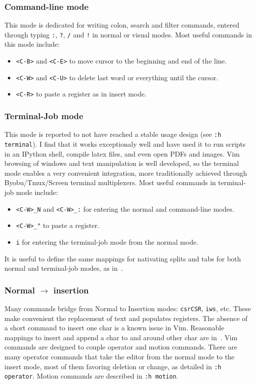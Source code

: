 \documentclass{article}
\newcommand{\ttt}[1] {
	\texttt{<#1>}}
\newcommand{\tttt}[1]{\texttt{#1}}
\begin{document}
\subsubsection{Command-line mode}
This mode is dedicated for writing colon, search and filter commands,
entered through typing \tttt{:}, \tttt{?}, \tttt{/} and \tttt{!} in normal or visual modes.
Most useful commands in this mode include:
\begin{itemize}
  \item \ttt{C-B} and \ttt{C-E} to move cursor to the beginning and
    end of the line.
  \item \ttt{C-W} and \ttt{C-U} to delete last word or everything
    until the cursor.
  \item \ttt{C-R} to paste a register as in insert mode.
\end{itemize}

\subsubsection{Terminal-Job mode}\label{terminal}
This mode is reported to not have reached a stable usage design
(see \tttt{:h terminal}).
I find that it works exceptionaly well and have used it to run
scripts in an IPython shell, compile latex files, and even open PDFs and images.
Vim browsing of windows and text manipulation is well developed,
so the terminal mode enables a very convenient integration,
more traditionally achieved through Byobu/Tmux/Screen terminal
multiplexers.
Most useful commands in terminal-job mode include:
\begin{itemize}
  \item \tttt{<C-W>\_N} and \tttt{<C-W>\_:} for entering the normal
    and command-line modes.
  \item \tttt{<C-W>\_"} to paste a register.
  \item \tttt{i} for entering the terminal-job mode from the normal mode.
\end{itemize}

It is useful to define the same mappings for nativating splits and tabs
for both normal and terminal-job modes, as in~\cite{vimrc}.

\subsubsection{Normal $\rightarrow$ insertion}\label{navIn}
Many commands bridge from Normal to Insertion modes:
\tttt{csrCSR}, \tttt{iws}, etc.
These make convenient the replacement of text and populates registers.
The absence of a short command to insert one char is
a known issue in Vim.
Reasonable mappings to insert and append a char to and around
other char are in~\cite{vimrc}.
Vim commands are designed to couple operator and motion commands.
There are many operator commands that take the editor from
the normal mode to the insert mode, most of them
favoring deletion or change, as detailed in \tttt{:h operator}.
Motion commands are described in \tttt{:h motion}.
\end{document}
